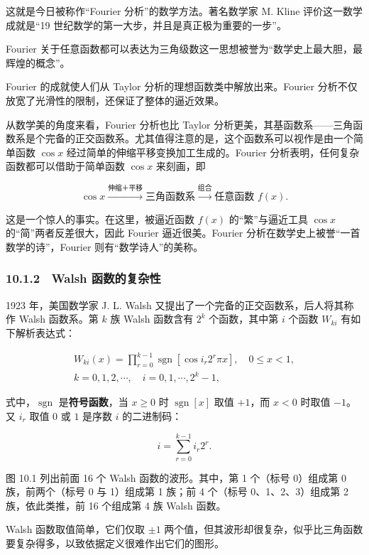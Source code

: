 \documentclass[
  10pt,
  fontset=fandol]{ctexart}
\begin{document}
这就是今日被称作``Fourier 分析''的数学方法。著名数学家 M. Kline 评价这一数学成就是``19 世纪数学的第一大步，并且是真正极为重要的一步''。

Fourier 关于任意函数都可以表达为三角级数这一思想被誉为``数学史上最大胆，最辉煌的概念''。

Fourier 的成就使人们从 Taylor 分析的理想函数类中解放出来。Fourier 分析不仅放宽了光滑性的限制，还保证了整体的逼近效果。

从数学美的角度来看，Fourier 分析也比 Taylor 分析更美，其基函数系------三角函数系是个完备的正交函数系。尤其值得注意的是，这个函数系可以视作是由一个简单函数 \(\cos x\) 经过简单的伸缩平移变换加工生成的。Fourier 分析表明，任何复杂函数都可以借助于简单函数 \(\cos x\) 来刻画，即

\[
\cos x\xrightarrow{\text{伸缩＋平移}}\text{三角函数系}\xrightarrow{\text{组合}}\text{任意函数 }f(x).
\]

这是一个惊人的事实。在这里，被逼近函数 \(f(x)\) 的``繁''与逼近工具 \(\cos x\) 的``简''两者反差很大，因此 Fourier 逼近很美。Fourier 分析在数学史上被誉``一首数学的诗''，Fourier 则有``数学诗人''的美称。

\subsubsection{10.1.2　Walsh 函数的复杂性}\label{walsh-ux51fdux6570ux7684ux590dux6742ux6027}

1923 年，美国数学家 J. L. Walsh 又提出了一个完备的正交函数系，后人将其称作 Walsh 函数系。第 \(k\) 族 Walsh 函数含有 \(2^k\) 个函数，其中第 \(i\) 个函数 \(W_{ki}\) 有如下解析表达式：

\[
\begin{gathered}
W_{ki}(x)=\prod_{r=0}^{k-1}\operatorname{sgn}[\cos i_r2^r\pi x],\quad 0\leqslant x<1,\\
k=0,1,2,\cdots,\quad i=0,1,\cdots,2^k-1,
\end{gathered}
\]

式中，\(\operatorname{sgn}\) 是\textbf{符号函数}，当 \(x\geqslant0\) 时 \(\operatorname{sgn}[x]\) 取值 \(+1\)，而 \(x<0\) 时取值 \(-1\)。又 \(i_r\) 取值 \(0\) 或 \(1\) 是序数 \(i\) 的二进制码：

\[
i=\sum_{r=0}^{k-1}i_r2^r.
\]

图 10.1 列出前面 16 个 Walsh 函数的波形。其中，第 1 个（标号 0）组成第 0 族，前两个（标号 0 与 1）组成第 1 族；前 4 个（标号 0、1、2、3）组成第 2 族，依此类推，前 16 个组成第 4 族 Walsh 函数。

Walsh 函数取值简单，它们仅取 \(\pm1\) 两个值，但其波形却很复杂，似乎比三角函数要复杂得多，以致依据定义很难作出它们的图形。
\end{document}
